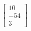 \documentclass[preview]{standalone}
\begin{document}
\begin{align*}
\begin{bmatrix} 10 \\ -54 \\ 3 \end{bmatrix}
\end{align*}
\end{document}
